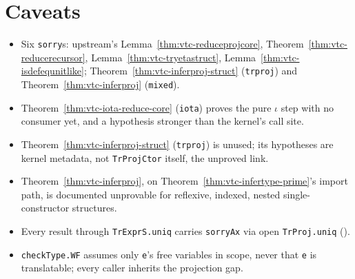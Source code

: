 \section*{Caveats}
\begin{itemize}
\item Six \texttt{sorry}s: upstream's Lemma~\ref{thm:vtc-reduceprojcore},
  Theorem~\ref{thm:vtc-reducerecursor}, Lemma~\ref{thm:vtc-tryetastruct},
  Lemma~\ref{thm:vtc-isdefequnitlike}; Theorem~\ref{thm:vtc-inferproj-struct}
  (\texttt{trproj}) and Theorem~\ref{thm:vtc-inferproj} (\texttt{mixed}).
\item Theorem~\ref{thm:vtc-iota-reduce-core} (\texttt{iota}) proves the pure $\iota$ step with
  no consumer yet, and a hypothesis stronger than the kernel's call site.
\item Theorem~\ref{thm:vtc-inferproj-struct} (\texttt{trproj}) is unused; its hypotheses are
  kernel metadata, not \texttt{TrProjCtor} itself, the unproved link.
\item Theorem~\ref{thm:vtc-inferproj}, on Theorem~\ref{thm:vtc-infertype-prime}'s import path, is
  documented unprovable for reflexive, indexed, nested single-constructor structures.
\item Every result through \texttt{TrExprS.uniq} carries \texttt{sorryAx} via open
  \texttt{TrProj.uniq} ().
\item \texttt{checkType.WF} assumes only \texttt{e}'s free variables in scope, never that
  \texttt{e} is translatable; every caller inherits the projection gap.
\end{itemize}
